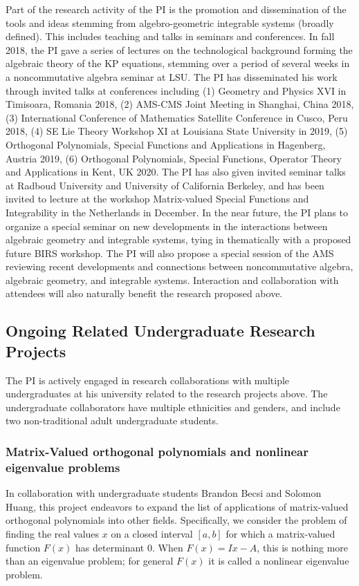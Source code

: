 \documentclass[11pt,letterpaper]{article}
\theoremstyle{definition}
\begin{document}
Part of the research activity of the PI is the promotion and dissemination of the tools and ideas stemming from algebro-geometric integrable systems (broadly defined).
This includes teaching and talks in seminars and conferences.
In fall 2018, the PI gave a series of lectures on the technological background forming the algebraic theory of the KP equations, stemming over a period of several weeks in a noncommutative algebra seminar at LSU.
The PI has disseminated his work through invited talks at conferences including (1) Geometry and Physics XVI in Timisoara, Romania 2018, (2) AMS-CMS Joint Meeting in Shanghai, China 2018, (3)  International Conference of Mathematics Satellite Conference in Cusco, Peru 2018, (4)  SE Lie Theory Workshop XI at Louisiana State University in 2019, (5) Orthogonal Polynomials, Special Functions and Applications in Hagenberg, Austria 2019, (6)  Orthogonal Polynomials, Special Functions, Operator Theory and Applications in Kent, UK 2020.
The PI has also given invited seminar talks at Radboud University and University of California Berkeley, and has been invited to lecture at the workshop Matrix-valued Special Functions and Integrability in the Netherlands in December.
In the near future, the PI plans to organize a special seminar on new developments in the interactions between algebraic geometry and integrable systems, tying in thematically with a proposed future BIRS workshop.
The PI will also propose a special session of the AMS reviewing recent developments and connections between noncommutative algebra, algebraic geometry, and integrable systems.
Interaction and collaboration with attendees will also naturally benefit the research proposed above.

\subsection{Ongoing Related Undergraduate Research Projects}
The PI is actively engaged in research collaborations with multiple undergraduates at his university related to the research projects above.
The undergraduate collaborators have multiple ethnicities and genders, and include two non-traditional adult undergraduate students.
\subsubsection*{Matrix-Valued orthogonal polynomials and nonlinear eigenvalue problems}
In collaboration with undergraduate students Brandon Becsi and Solomon Huang, this project endeavors to expand the list of applications of matrix-valued orthogonal polynomials into other fields.
Specifically, we consider the problem of finding the real values $x$ on a closed interval $[a,b]$ for which a matrix-valued function $F(x)$ has determinant $0$.  When $F(x)=Ix-A$, this is nothing more than an eigenvalue problem; for general $F(x)$ it is called a nonlinear eigenvalue problem.
\end{document}
